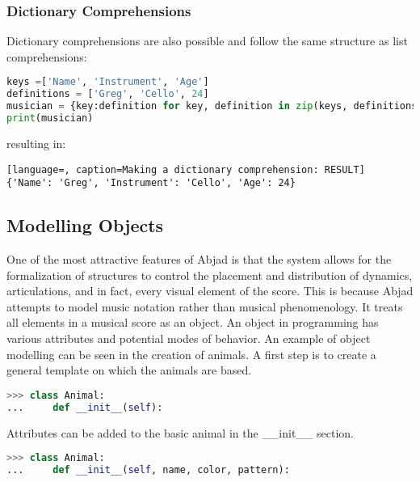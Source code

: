 \subsubsection{Dictionary Comprehensions}

Dictionary comprehensions are also possible and follow the same structure as list comprehensions:

\singlespace
\begin{lstlisting}[language=Python, caption=Making a dictionary comprehension]
keys =['Name', 'Instrument', 'Age']
definitions = ['Greg', 'Cello', 24]
musician = {key:definition for key, definition in zip(keys, definitions)}
print(musician)
\end{lstlisting}
\doublespace

resulting in:

\singlespace
\begin{lstlisting}[language=, caption=Making a dictionary comprehension: RESULT]
{'Name': 'Greg', 'Instrument': 'Cello', 'Age': 24}
\end{lstlisting}
\doublespace

\subsection{Modelling Objects}

One of the most attractive features of Abjad is that the system allows for the formalization of structures to control the placement and distribution of dynamics, articulations, and in fact, every visual element of the score. This is because Abjad attempts to model music notation rather than musical phenomenology. It treats all elements in a musical score as an object. An object in programming has various attributes and potential modes of behavior. An example of object modelling can be seen in the creation of animals. A first step is to create a general template on which the animals are based.

\singlespace
\begin{lstlisting}[language=Python, caption=Creating an empty class in python]
>>> class Animal:
... 	def __init__(self):
\end{lstlisting}
\doublespace

Attributes can be added to the basic animal in the \_\_init\_\_ section.

\singlespace
\begin{lstlisting}[language=Python, caption=Adding attributes to classes]
>>> class Animal:
... 	def __init__(self, name, color, pattern):
\end{lstlisting}
\doublespace

